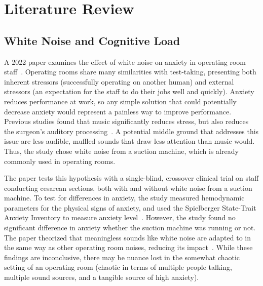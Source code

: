\documentclass[journal]{IEEEtran}
\begin{document}
\section{Literature Review}
\subsection{White Noise and Cognitive Load}
A 2022 paper examines the effect of white noise on anxiety in operating room staff~\cite{shahrokhiEffectWhiteNoise2022}. Operating rooms share many similarities with test-taking, presenting both inherent stressors (successfully operating on another human) and external stressors (an expectation for the staff to do their jobs well and quickly). Anxiety reduces performance at work, so any simple solution that could potentially decrease anxiety would represent a painless way to improve performance. Previous studies found that music significantly reduces stress, but also reduces the surgeon's auditory processing~\cite[p.~2]{wayEffectNoiseAuditory2013}. A potential middle ground that addresses this issue are less audible, muffled sounds that draw less attention than music would. Thus, the study chose white noise from a suction machine, which is already commonly used in operating rooms.

The paper tests this hypothesis with a single-blind, crossover clinical trial on staff conducting cesarean sections, both with and without white noise from a suction machine. To test for differences in anxiety, the study measured hemodynamic parameters for the physical signs of anxiety, and used the Spielberger State-Trait Anxiety Inventory to measure anxiety level~\cite[pg.~1]{shahrokhiEffectWhiteNoise2022}. However, the study found no significant difference in anxiety whether the suction machine was running or not. The paper theorized that meaningless sounds like white noise are adapted to in the same way as other operating room noises, reducing its impact~\cite[pg.~3]{shahrokhiEffectWhiteNoise2022}. While these findings are inconclusive, there may be nuance lost in the somewhat chaotic setting of an operating room (chaotic in terms of multiple people talking, multiple sound sources, and a tangible source of high anxiety). 
\end{document}
